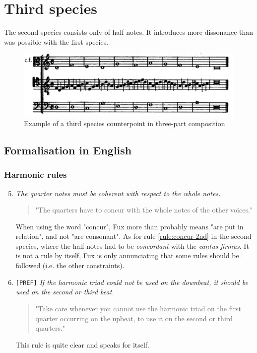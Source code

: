 \section{Third species}
The second species consists only of half notes. It introduces more dissonance than was possible with the first species. 

\begin{figure}[h]
    \centering
    \includegraphics[width=1\textwidth]{Images/Species_examples/3sp-example.png}
    \caption{Example of a third species counterpoint in three-part composition}
    \label{fig:example-3sp}
\end{figure}
\subsection{Formalisation in English}\label{formalisation-en-3rd}
\subsubsection{Harmonic rules}
\begin{enumerate}[wide, label=\bfseries 3.H\arabic*]
\setcounter{enumi}{4}
    \item \textit{The quarter notes must be coherent with respect to the whole notes.} \label{rule:concur-3rd}    
    \begin{quotation}
        "The quarters have to concur with the whole notes of the other voices."
        \textcite[p.91]{GaPEng}
    \end{quotation}
    When using the word "concur", Fux more than probably means "are put in relation", and not "are consonant". As for rule \ref{rule:concur-2nd} in the second species, where the half notes had to be \textit{concordant} with the \textit{cantus firmus}. It is not a rule by itself, Fux is only annunciating that some rules should be followed (i.e. the other constraints).

    \item\texttt{[PREF]}  \textit{If the harmonic triad could not be used on the downbeat, it should be used on the second or third beat.} \label{rule:h-triad-3rd-sp}     
    \begin{quotation}
        "Take care whenever you cannot use the harmonic triad on the first quarter occurring on the upbeat, to use it on the second or third quarters."
        \textcite[p.91]{GaPEng}
    \end{quotation}

    This rule is quite clear and speaks for itself.
\end{enumerate}

